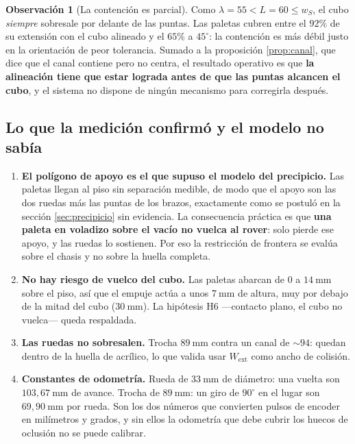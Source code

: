 \documentclass[11pt,a4paper]{article}
\theoremstyle{definition}
\newtheorem{observacion}[teorema]{Observación}
\newcommand{\grados}{^{\circ}}
\begin{document}
\begin{observacion}[La contención es parcial]
Como $\lambda = 55 < L = 60 \le w_S$, el cubo \emph{siempre} sobresale por delante de las
puntas. Las paletas cubren entre el $92\%$ de su extensión con el cubo alineado y el
$65\%$ a $45\grados$: la contención es más débil justo en la orientación de peor
tolerancia. Sumado a la proposición \ref{prop:canal}, que dice que el canal contiene pero
no centra, el resultado operativo es que \textbf{la alineación tiene que estar lograda
antes de que las puntas alcancen el cubo}, y el sistema no dispone de ningún mecanismo
para corregirla después.
\end{observacion}

\subsection{Lo que la medición confirmó y el modelo no sabía}

\begin{enumerate}[label=(\alph*),leftmargin=2.2em,itemsep=4pt]
\item \textbf{El polígono de apoyo es el que supuso el modelo del precipicio.} Las paletas
      llegan al piso sin separación medible, de modo que el apoyo son las dos ruedas más
      las puntas de los brazos, exactamente como se postuló en la sección
      \ref{sec:precipicio} sin evidencia. La consecuencia práctica es que \textbf{una
      paleta en voladizo sobre el vacío no vuelca al rover}: solo pierde ese apoyo, y las
      ruedas lo sostienen. Por eso la restricción de frontera se evalúa sobre el chasis y
      no sobre la huella completa.
\item \textbf{No hay riesgo de vuelco del cubo.} Las paletas abarcan de $0$ a
      $14\ \mathrm{mm}$ sobre el piso, así que el empuje actúa a unos $7\ \mathrm{mm}$ de
      altura, muy por debajo de la mitad del cubo ($30\ \mathrm{mm}$). La hipótesis H6
      ---contacto plano, el cubo no vuelca--- queda respaldada.
\item \textbf{Las ruedas no sobresalen.} Trocha $89\ \mathrm{mm}$ contra un canal de
      $\sim\!94$: quedan dentro de la huella de acrílico, lo que valida usar
      $W_{\mathrm{ext}}$ como ancho de colisión.
\item \textbf{Constantes de odometría.} Rueda de $33\ \mathrm{mm}$ de diámetro: una vuelta
      son $103{,}67\ \mathrm{mm}$ de avance. Trocha de $89\ \mathrm{mm}$: un giro de
      $90\grados$ en el lugar son $69{,}90\ \mathrm{mm}$ por rueda. Son los dos números que
      convierten pulsos de encoder en milímetros y grados, y sin ellos la odometría que
      debe cubrir los huecos de oclusión no se puede calibrar.
\end{enumerate}
\end{document}

